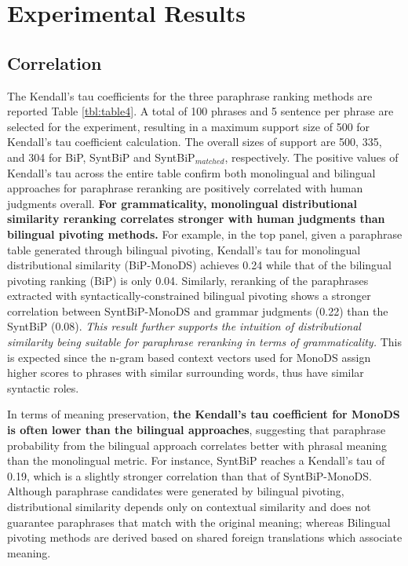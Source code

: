 \documentclass[11pt]{article}
\newcommand{\mnote}[1]{\marginpar{\raggedleft\footnotesize\itshape#1}}
\begin{document}
\section{Experimental Results}
\label{sect:results_fr_en}

\subsection{Correlation}
The Kendall's tau coefficients for the three paraphrase ranking methods are reported Table \ref{tbl:table4}. A total of 100 phrases and 5 sentence per phrase are selected for the experiment, resulting in a maximum support size of 500 for Kendall's tau coefficient calculation. The overall sizes of support are 500, 335, and 304 for BiP, SyntBiP and SyntBiP$_{matched}$, respectively. The positive values of Kendall's tau across the entire table confirm both monolingual and bilingual approaches for paraphrase reranking are positively correlated with human judgments overall. \textbf{For grammaticality, monolingual distributional similarity reranking correlates stronger with human judgments than bilingual pivoting methods.} For example, in the top panel, given a paraphrase table generated through bilingual pivoting, Kendall's tau for monolingual distributional similarity (BiP-MonoDS) achieves 0.24 while that of the bilingual pivoting ranking (BiP) is only 0.04. Similarly, reranking of the paraphrases extracted with syntactically-constrained bilingual pivoting shows a stronger correlation between SyntBiP-MonoDS and grammar judgments (0.22) than the SyntBiP (0.08). \emph{This result further supports the intuition of distributional similarity being suitable for paraphrase reranking in terms of grammaticality.} This is expected since the %
n-gram based context vectors used for MonoDS assign higher scores to phrases with similar surrounding words, thus have similar syntactic roles.

In terms of meaning preservation, \textbf{the Kendall's tau coefficient for MonoDS is often lower than the bilingual approaches}, suggesting that paraphrase probability from the bilingual approach correlates better with phrasal meaning than the monolingual metric. For instance, SyntBiP reaches a Kendall's tau of 0.19, which is a slightly stronger correlation than that of SyntBiP-MonoDS. Although paraphrase candidates were generated by bilingual pivoting, distributional similarity depends only on contextual similarity and does not guarantee paraphrases that match with the original meaning; whereas Bilingual pivoting methods are derived based on %
shared foreign translations which associate meaning. 
\end{document}
